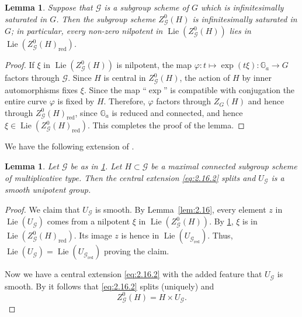 \documentclass[11pt,a4paper]{article}
\theoremstyle{plain}
\newtheorem{lemma}[theorem]{Lemma}
\theoremstyle{definition}
\DeclareMathOperator{\Lie}{Lie}
\newcommand{\G}{\mathbb{G}}
\newcommand{\red}{\mathrm{red}}
\begin{document}
\begin{lemma} \label{lem:2.17}
Suppose that $\mathcal{G}$ is a subgroup scheme of $G$ which is infinitesimally saturated in $G$. Then the subgroup scheme $Z^0_\mathcal{G}(H)$ is infinitesimally saturated in $G$; in particular, every non-zero nilpotent in $\Lie(Z^0_\mathcal{G}(H))$ lies in $\Lie(Z^0_\mathcal{G}(H)_\red)$.
\end{lemma}

\begin{proof}
If $\xi$ in $\Lie(Z^0_\mathcal{G}(H))$ is nilpotent, the map $\varphi : t \mapsto \exp(t\xi) : \G_a \to G$ factors through $\mathcal{G}$. Since $H$ is central in $Z^0_\mathcal{G}(H)$, the action of $H$ by inner automorphisms fixes $\xi$. Since the map ``$\exp$'' is compatible with conjugation the entire curve $\varphi$ is fixed by $H$. Therefore, $\varphi$ factors through $Z_G(H)$ and hence through $Z^0_\mathcal{G}(H)_\red$, since $\G_a$ is reduced and connected, and hence $\xi \in \Lie(Z^0_\mathcal{G}(H)_\red)$. This completes the proof of the lemma. \qedhere
\end{proof}

We have the following extension of \cite[Lemma~2.7, Corollary~2.11]{D}.

\begin{lemma} \label{lem:2.18}
Let $\mathcal{G}$ be as in \ref{lem:2.17}. Let $H \subset \mathcal{G}$ be a maximal connected subgroup scheme of multiplicative type. Then the central extension \eqref{eq:2.16.2} splits and $U_\mathcal{G}$ is a smooth unipotent group.
\end{lemma}

\begin{proof}
We claim that $U_\mathcal{G}$ is smooth. By Lemma~\ref{lem:2.16}, every element $z$ in $\Lie(U_\mathcal{G})$ comes from a nilpotent $\xi$ in $\Lie(Z^0_\mathcal{G}(H))$. By \ref{lem:2.17}, $\xi$ is in $\Lie(Z^0_\mathcal{G}(H)_\red)$. Its image $z$ is hence in $\Lie(U_{\mathcal{G}_\red})$. Thus, $\Lie(U_\mathcal{G}) = \Lie(U_{\mathcal{G}_\red})$ proving the claim.

Now we have a central extension \eqref{eq:2.16.2} with the added feature that $U_\mathcal{G}$ is smooth. By \cite[SGA3, Expos\'e XVII, Theorem~6.1.1]{SGA3} it follows that \eqref{eq:2.16.2} splits (uniquely) and
\begin{equation} \label{eq:2.18.1}
Z^0_\mathcal{G}(H) = H \times U_\mathcal{G}.
\end{equation} \qedhere
\end{proof}
\end{document}
